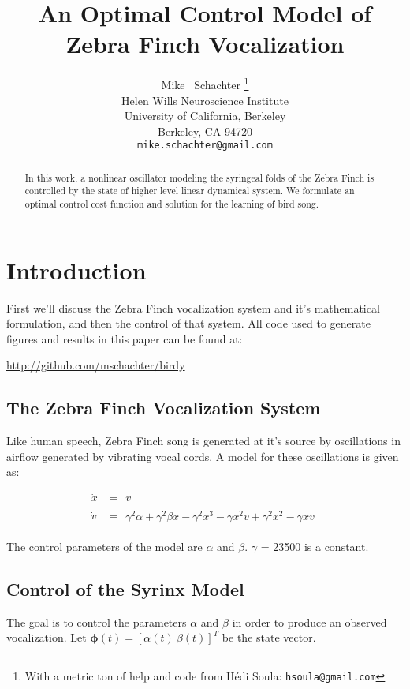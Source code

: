 \documentclass{article} %
\title{An Optimal Control Model of Zebra Finch Vocalization}
\author{
Mike ~Schachter
\thanks{ With a metric ton of help and code from H\'{e}di Soula:
\texttt{hsoula@gmail.com}} \\
Helen Wills Neuroscience Institute\\
University of California, Berkeley\\
Berkeley, CA 94720 \\
\texttt{mike.schachter@gmail.com}
}
\begin{document}
\maketitle

\begin{abstract}
In this work, a nonlinear oscillator modeling the syringeal folds of the
Zebra Finch is controlled by the state of higher level linear dynamical system.
We formulate an optimal control cost function and solution for the learning of
bird song.
\end{abstract}

\section{Introduction}

First we'll discuss the Zebra Finch vocalization system and it's mathematical
formulation, and then the control of that system. All code used to generate
figures and results in this paper can be found at:
\begin{center}
   \url{http://github.com/mschachter/birdy}
\end{center}

\subsection{The Zebra Finch Vocalization System}

Like human speech, Zebra Finch song is generated at it's source by oscillations in airflow
generated by vibrating vocal cords. A model for these oscillations is given as:

\begin{align*}
\dot{x}&=\begin{aligned}v\end{aligned} \\
\dot{v}&=\begin{aligned}\gamma^2 \alpha + \gamma^2 \beta x - \gamma^2 x^3 - \gamma x^2 v + \gamma^2 x^2 - \gamma x v\end{aligned}
\end{align*}

The control parameters of the model are $\alpha$ and $\beta$. $\gamma$ = 23500 is a constant.

\subsection{Control of the Syrinx Model}

The goal is to control the parameters $\alpha$ and $\beta$ in order to produce an observed
vocalization. Let $\bm{\phi}(t) = \left[ \alpha(t) ~ \beta(t) \right]^T$ be the state vector.
\end{document}
